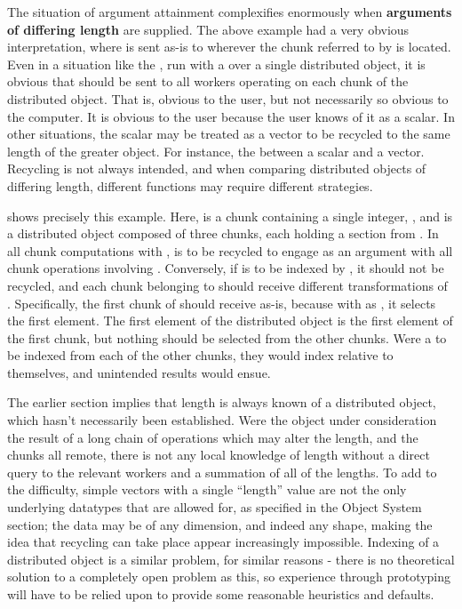 The situation of argument attainment complexifies enormously when \textbf{arguments of differing length} are supplied.
The above example had a very obvious interpretation, where  is sent as-is to wherever the chunk referred to by  is located.
Even in a situation like the , run with a  over a single distributed object, it is obvious that  should be sent to all workers operating on each chunk of the distributed object.
That is, obvious to the user, but not necessarily so obvious to the computer.
It is obvious to the user because the user knows of it as a scalar.
In other situations, the scalar may be treated as a vector to be recycled to the same length of the greater object.
For instance, the  between a scalar and a vector.
Recycling is not always intended, and when comparing distributed objects of differing length, different functions may require different strategies.

 shows precisely this example.
Here,  is a chunk containing a single integer, , and  is a distributed object composed of three chunks, each holding a section from .
In all chunk computations with ,  is to be recycled to engage as an argument with all chunk operations involving .
Conversely, if  is to be indexed by , it should not be recycled, and each chunk belonging to  should receive different transformations of .
Specifically, the first chunk of  should receive  as-is, because with  as , it selects the first element.
The first element of the distributed object is the first element of the first chunk, but nothing should be selected from the other chunks.
Were a  to be indexed from each of the other chunks, they would index relative to themselves, and unintended results would ensue.


The earlier section implies that length is always known of a distributed object, which hasn't necessarily been established.
Were the object under consideration the result of a long chain of operations which may alter the length, and the chunks all remote, there is not any local knowledge of length without a direct query to the relevant workers and a summation of all of the lengths.
To add to the difficulty, simple vectors with a single ``length'' value are not the only underlying datatypes that are allowed for, as specified in the Object System section; the data may be of any dimension, and indeed any shape, making the idea that recycling can take place appear increasingly impossible.
Indexing of a distributed object is a similar problem, for similar reasons - there is no theoretical solution to a completely open problem as this, so experience through prototyping will have to be relied upon to provide some reasonable heuristics and defaults.

